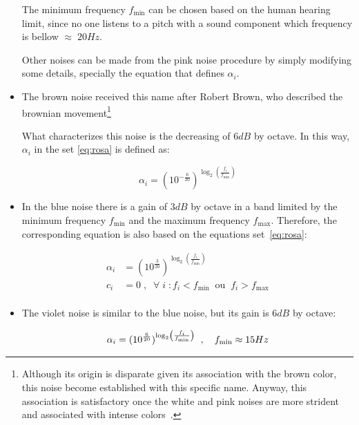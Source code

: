 \documentclass[
 aip,
 jmp,
 amsmath,amssymb,
 reprint,
]{revtex4-1}
\begin{document}
\begin{itemize}
The minimum frequency $f_{\text{min}}$ can be chosen based on the human hearing limit, since no one listens to a pitch with a sound component which frequency is bellow $\approx\; 20Hz$.

Other noises can be made from the pink noise procedure by simply modifying some details, specially the equation that defines $\alpha_i$.

  \item The brown noise received this name after Robert Brown, who described the brownian movement\footnote{Although its origin is disparate given its association with the brown color, this noise become established with this specific name.
  Anyway, this association is satisfactory once the white and pink noises are more strident and associated with intense colors~\cite{Cook,guillaume}.}

What characterizes this noise is the decreasing of $6dB$ by octave. In this way, $\alpha_i$ in the set \ref{eq:rosa} is defined as:

\begin{equation}\label{eq:marrom}
 \alpha_i=(10^{-\frac{6}{20}})^{\log _2 \left( \frac{f_i}{f_{\text{min}}} \right )}
\end{equation}

 \item In the blue noise there is a gain of $3dB$ by octave in a band limited by the minimum frequency $f_{\text{min}}$ and the maximum frequency $f_{\text{max}}$. Therefore, the corresponding equation is also based on the equations set~\ref{eq:rosa}:

\begin{equation}\label{eq:azul}
 \begin{split}
 \alpha_i & = (10^{\frac{3}{20}})^{\log _2 \left ( \frac{f_i}{f_{\text{min}}} \right )} \\
 c_i & =0\;,\;\; \forall \; i \; : f_i<f_{\text{min}} \;\; \text{ou} \;\; f_i>f_{\text{max}} \\
 \end{split}
\end{equation}

 \item The violet noise is similar to the blue noise, but its gain is $6dB$ by octave:

\begin{equation}\label{eq:violeta}
 \alpha_i = (10^{\frac{6}{20}})^{\log _2 \left ( \frac{f_i}{f_{\text{min}}} \right )} \;\;, \quad f_{\text{min}} \approx 15 Hz \\
\end{equation}


\end{itemize}
\end{document}
